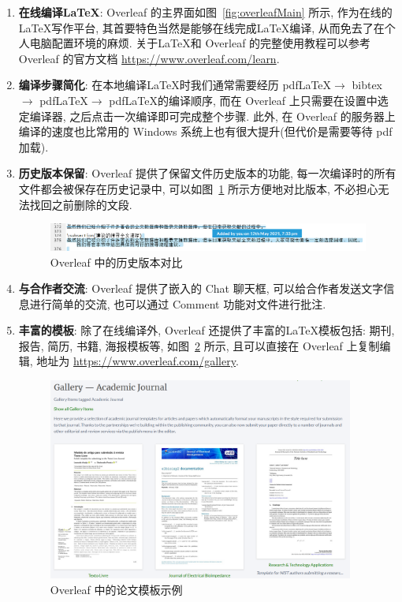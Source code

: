 \documentclass{formatBook}
\begin{document}
\begin{enumerate}
    \item \textbf{在线编译\LaTeX }: Overleaf 的主界面如图~\ref{fig:overleafMain} 所示, 作为在线的\LaTeX 写作平台, 其首要特色当然是能够在线完成\LaTeX 编译, 从而免去了在个人电脑配置环境的麻烦. 关于\LaTeX 和 Overleaf 的完整使用教程可以参考 Overleaf 的官方文档 \url{https://www.overleaf.com/learn}.
    \item \textbf{编译步骤简化}: 在本地编译\LaTeX 时我们通常需要经历 pdf\LaTeX $\rightarrow$ bibtex $\rightarrow$ pdf\LaTeX $\rightarrow$ pdf\LaTeX 的编译顺序, 而在 Overleaf 上只需要在设置中选定编译器, 之后点击一次编译即可完成整个步骤. 此外, 在 Overleaf 的服务器上编译的速度也比常用的 Windows 系统上也有很大提升(但代价是需要等待 pdf 加载).
    \item \textbf{历史版本保留}: Overleaf 提供了保留文件历史版本的功能, 每一次编译时的所有文件都会被保存在历史记录中, 可以如图~\ref{fig:history} 所示方便地对比版本, 不必担心无法找回之前删除的文段.
          \begin{figure}[H]
              \centering
              \includegraphics[width=\textwidth]{figure/history.png}
              \caption{Overleaf 中的历史版本对比}
              \label{fig:history}
          \end{figure}
    \item \textbf{与合作者交流}: Overleaf 提供了嵌入的 Chat 聊天框, 可以给合作者发送文字信息进行简单的交流, 也可以通过 Comment 功能对文件进行批注.
    \item \textbf{丰富的模板}: 除了在线编译外, Overleaf 还提供了丰富的\LaTeX 模板包括: 期刊, 报告, 简历, 书籍, 海报模板等, 如图~\ref{fig:template} 所示, 且可以直接在 Overleaf 上复制编辑, 地址为 \url{https://www.overleaf.com/gallery}.
          \begin{figure}[htbp]
              \centering 
              \includegraphics[width=0.95\textwidth]{figure/template.png}
              \caption{Overleaf 中的论文模板示例}
              \label{fig:template}
          \end{figure}
\end{enumerate}
\end{document}
